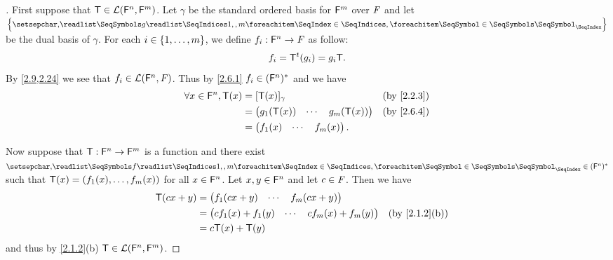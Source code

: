 \begin{proof}[]
	First suppose that \(\mathsf{T} \in \mathcal{L}(\mathsf{F}^n, \mathsf{F}^m)\).
	Let \(\gamma\) be the standard ordered basis for \(\mathsf{F}^m\) over \(\mathit{F}\) and let \(\set{\seq{g}{1,,m}}\) be the dual basis of \(\gamma\).
	For each \(i \in \left\lbrace1, \dots, m\right\rbrace\), we define \(f_i : \mathsf{F}^n \to \mathit{F}\) as follow:
	\[
		f_i = {\mathsf{T}}^{t}(g_i) = g_i \mathsf{T}.
	\]
	By \cref{2.9,2.24} we see that \(f_i \in \mathcal{L}(\mathsf{F}^n, \mathit{F})\).
	Thus by \cref{2.6.1} \(f_i \in (\mathsf{F}^n)^*\) and we have
	\begin{align*}
		\forall x \in \vs{F}^n, \T(x) & = [\T(x)]_{\gamma}                &  & \by{2.2.3} \\
		                              & = \begin{pmatrix}
			                                  g_1(\T(x)) & \cdots & g_m(\T(x))
		                                  \end{pmatrix} &  & \by{2.6.4}                \\
		                              & = \begin{pmatrix}
			                                  f_1(x) & \cdots & f_m(x)
		                                  \end{pmatrix}.
	\end{align*}

	Now suppose that \(\mathsf{T} : \mathsf{F}^n \to \mathsf{F}^m\) is a function and there exist \(\seq{f}{1,,m} \in (\vs{F}^n)^*\) such that \(\mathsf{T}(x) = (f_1(x), \dots, f_m(x))\) for all \(x \in \mathsf{F}^n\).
	Let \(x, y \in \mathsf{F}^n\) and let \(c \in \mathit{F}\).
	Then we have
	\begin{align*}
		\T(cx + y) & = \begin{pmatrix}
			               f_1(cx + y) & \cdots & f_m(cx + y)
		               \end{pmatrix}             \\
		           & = \begin{pmatrix}
			               c f_1(x) + f_1(y) & \cdots & c f_m(x) + f_m(y)
		               \end{pmatrix} &  & \by{2.1.2}[b] \\
		           & = c \T(x) + \T(y)
	\end{align*}
	and thus by \cref{2.1.2}(b) \(\mathsf{T} \in \mathcal{L}(\mathsf{F}^n, \mathsf{F}^m)\).
\end{proof}

